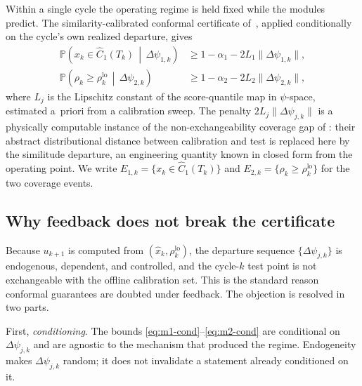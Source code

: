 Within a single cycle the operating regime is held fixed while the modules
predict. The similarity-calibrated conformal certificate of~\citet{busico_m3},
applied conditionally on the cycle's own realized departure, gives
\begin{align}
\mathbb{P}\!\left(x_k \in \hat C_1(T_k) \,\middle|\, \Delta\psi_{1,k}\right)
  &\ge 1-\alpha_1 - 2L_1\|\Delta\psi_{1,k}\|, \label{eq:m1-cond}\\
\mathbb{P}\!\left(\rho_k \ge \rho_k^{\mathrm{lo}} \,\middle|\, \Delta\psi_{2,k}\right)
  &\ge 1-\alpha_2 - 2L_2\|\Delta\psi_{2,k}\|, \label{eq:m2-cond}
\end{align}
where $L_j$ is the Lipschitz constant of the score-quantile map in $\psi$-space,
estimated a~priori from a calibration sweep. The penalty $2L_j\|\Delta\psi_{j,k}\|$
is a physically computable instance of the non-exchangeability coverage gap of
\citet{barber2023}: their abstract distributional distance between calibration and
test is replaced here by the similitude departure, an engineering quantity known
in closed form from the operating point. We write
$E_{1,k} = \{x_k \in \hat C_1(T_k)\}$ and
$E_{2,k} = \{\rho_k \ge \rho_k^{\mathrm{lo}}\}$ for the two coverage events.

\subsection{Why feedback does not break the certificate}
\label{sec:causal}

Because $u_{k+1}$ is computed from $(\hat x_k, \rho_k^{\mathrm{lo}})$, the departure
sequence $\{\Delta\psi_{j,k}\}$ is endogenous, dependent, and controlled, and the
cycle-$k$ test point is not exchangeable with the offline calibration set. This is
the standard reason conformal guarantees are doubted under feedback. The objection
is resolved in two parts.

First, \emph{conditioning}. The bounds \eqref{eq:m1-cond}--\eqref{eq:m2-cond} are
conditional on $\Delta\psi_{j,k}$ and are agnostic to the mechanism that produced
the regime. Endogeneity makes $\Delta\psi_{j,k}$ random; it does not invalidate a
statement already conditioned on it.

